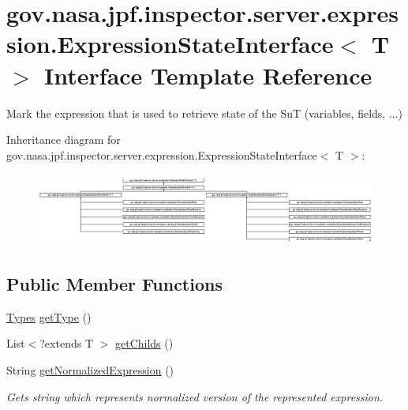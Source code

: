 \hypertarget{interfacegov_1_1nasa_1_1jpf_1_1inspector_1_1server_1_1expression_1_1_expression_state_interface}{}\section{gov.\+nasa.\+jpf.\+inspector.\+server.\+expression.\+Expression\+State\+Interface$<$ T $>$ Interface Template Reference}
\label{interfacegov_1_1nasa_1_1jpf_1_1inspector_1_1server_1_1expression_1_1_expression_state_interface}


Mark the expression that is used to retrieve state of the SuT (variables, fields, ...)  


Inheritance diagram for gov.\+nasa.\+jpf.\+inspector.\+server.\+expression.\+Expression\+State\+Interface$<$ T $>$\+:\begin{figure}[H]
\begin{center}
\leavevmode
\includegraphics[height=2.400000cm]{interfacegov_1_1nasa_1_1jpf_1_1inspector_1_1server_1_1expression_1_1_expression_state_interface}
\end{center}
\end{figure}
\subsection*{Public Member Functions}
\begin{DoxyCompactItemize}
\item 
\hyperlink{enumgov_1_1nasa_1_1jpf_1_1inspector_1_1server_1_1expression_1_1_types}{Types} \hyperlink{interfacegov_1_1nasa_1_1jpf_1_1inspector_1_1server_1_1expression_1_1_expression_node_interface_a5799ecbb793f24840fa3e2eaedc799aa}{get\+Type} ()
\item 
List$<$?extends T $>$ \hyperlink{interfacegov_1_1nasa_1_1jpf_1_1inspector_1_1server_1_1expression_1_1_expression_node_interface_aaeec5305da52fbad211a7abf22b0a854}{get\+Childs} ()
\item 
String \hyperlink{interfacegov_1_1nasa_1_1jpf_1_1inspector_1_1server_1_1expression_1_1_expression_node_interface_ae5387d8da0126c1256a786d54b9bd7ce}{get\+Normalized\+Expression} ()
\begin{DoxyCompactList}\small\item\em Gets string which represents normalized version of the represented expression. \end{DoxyCompactList}\end{DoxyCompactItemize}


